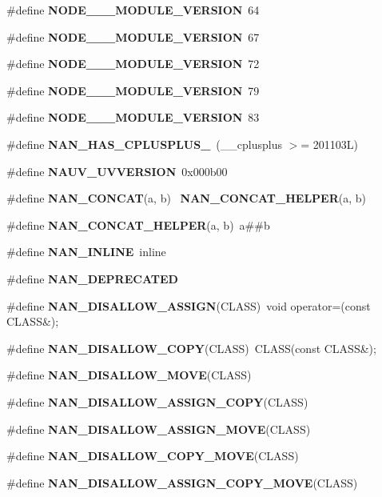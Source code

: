 \begin{DoxyCompactItemize}
\#define \textbf{ N\+O\+D\+E\+\_\+\_\+\_\+\+M\+O\+D\+U\+L\+E\+\_\+\+V\+E\+R\+S\+I\+ON}~64
\item 
\#define \textbf{ N\+O\+D\+E\+\_\+\_\+\_\+\+M\+O\+D\+U\+L\+E\+\_\+\+V\+E\+R\+S\+I\+ON}~67
\item 
\#define \textbf{ N\+O\+D\+E\+\_\+\_\+\_\+\+M\+O\+D\+U\+L\+E\+\_\+\+V\+E\+R\+S\+I\+ON}~72
\item 
\#define \textbf{ N\+O\+D\+E\+\_\+\_\+\_\+\+M\+O\+D\+U\+L\+E\+\_\+\+V\+E\+R\+S\+I\+ON}~79
\item 
\#define \textbf{ N\+O\+D\+E\+\_\+\_\+\_\+\+M\+O\+D\+U\+L\+E\+\_\+\+V\+E\+R\+S\+I\+ON}~83
\item 
\#define \textbf{ N\+A\+N\+\_\+\+H\+A\+S\+\_\+\+C\+P\+L\+U\+S\+P\+L\+U\+S\+\_}~(\+\_\+\+\_\+cplusplus $>$= 201103\+L)
\item 
\#define \textbf{ N\+A\+U\+V\+\_\+\+U\+V\+V\+E\+R\+S\+I\+ON}~0x000b00
\item 
\#define \textbf{ N\+A\+N\+\_\+\+C\+O\+N\+C\+AT}(a,  b)~\textbf{ N\+A\+N\+\_\+\+C\+O\+N\+C\+A\+T\+\_\+\+H\+E\+L\+P\+ER}(a, b)
\item 
\#define \textbf{ N\+A\+N\+\_\+\+C\+O\+N\+C\+A\+T\+\_\+\+H\+E\+L\+P\+ER}(a,  b)~a\#\#b
\item 
\#define \textbf{ N\+A\+N\+\_\+\+I\+N\+L\+I\+NE}~inline
\item 
\#define \textbf{ N\+A\+N\+\_\+\+D\+E\+P\+R\+E\+C\+A\+T\+ED}
\item 
\#define \textbf{ N\+A\+N\+\_\+\+D\+I\+S\+A\+L\+L\+O\+W\+\_\+\+A\+S\+S\+I\+GN}(C\+L\+A\+SS)~void operator=(const C\+L\+A\+SS\&);
\item 
\#define \textbf{ N\+A\+N\+\_\+\+D\+I\+S\+A\+L\+L\+O\+W\+\_\+\+C\+O\+PY}(C\+L\+A\+SS)~C\+L\+A\+SS(const C\+L\+A\+SS\&);
\item 
\#define \textbf{ N\+A\+N\+\_\+\+D\+I\+S\+A\+L\+L\+O\+W\+\_\+\+M\+O\+VE}(C\+L\+A\+SS)
\item 
\#define \textbf{ N\+A\+N\+\_\+\+D\+I\+S\+A\+L\+L\+O\+W\+\_\+\+A\+S\+S\+I\+G\+N\+\_\+\+C\+O\+PY}(C\+L\+A\+SS)
\item 
\#define \textbf{ N\+A\+N\+\_\+\+D\+I\+S\+A\+L\+L\+O\+W\+\_\+\+A\+S\+S\+I\+G\+N\+\_\+\+M\+O\+VE}(C\+L\+A\+SS)
\item 
\#define \textbf{ N\+A\+N\+\_\+\+D\+I\+S\+A\+L\+L\+O\+W\+\_\+\+C\+O\+P\+Y\+\_\+\+M\+O\+VE}(C\+L\+A\+SS)
\item 
\#define \textbf{ N\+A\+N\+\_\+\+D\+I\+S\+A\+L\+L\+O\+W\+\_\+\+A\+S\+S\+I\+G\+N\+\_\+\+C\+O\+P\+Y\+\_\+\+M\+O\+VE}(C\+L\+A\+SS)
\item 

\end{DoxyCompactItemize}
